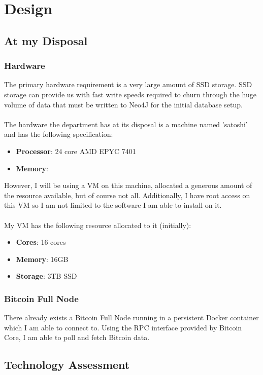\chapter{Design}

\section{At my Disposal} 

\subsection{Hardware}
The primary hardware requirement is a very large amount of SSD storage. SSD storage can provide us with fast write speeds required to churn through the huge volume of data that must be written to Neo4J for the initial database setup.
\\\\
The hardware the department has at its disposal is a machine named 'satoshi' and has the following specification:
\begin{itemize}
    \item \textbf{Processor}: 24 core AMD EPYC 7401 
    \item \textbf{Memory}: 
\end{itemize}
However, I will be using a VM on this machine, allocated a generous amount of the resource available, but of course not all. Additionally, I have root access on this VM so I am not limited to the software I am able to install on it. 
\\\\
My VM has the following resource allocated to it (initially):
\begin{itemize}
    \item \textbf{Cores}: 16 cores 
    \item \textbf{Memory}: 16GB
    \item \textbf{Storage}: 3TB SSD
\end{itemize}

\subsection{Bitcoin Full Node}
There already exists a Bitcoin Full Node running in a persistent Docker container which I am able to connect to. Using the RPC interface provided by Bitcoin Core, I am able to poll and fetch Bitcoin data. 

\section{Technology Assessment}


